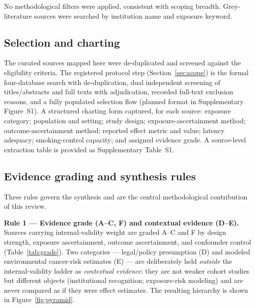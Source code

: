 \documentclass[3p,times]{elsarticle}
\begin{document}
No methodological filters were applied, consistent with scoping breadth. Grey-literature sources were searched by institution name and exposure keyword.

\subsection{Selection and charting}
The curated sources mapped here were de-duplicated and screened against the eligibility criteria. The registered protocol step (Section~\ref{sec:scope}) is the formal four-database search with de-duplication, dual independent screening of titles/abstracts and full texts with adjudication, recorded full-text exclusion reasons, and a fully populated selection flow (planned format in Supplementary Figure~S1). A structured charting form captured, for each source: exposure category; population and setting; study design; exposure-ascertainment method; outcome-ascertainment method; reported effect metric and value; latency adequacy; smoking-control capacity; and assigned evidence grade. A source-level extraction table is provided as Supplementary Table~S1.

\subsection{Evidence grading and synthesis rules}\label{sec:rules}
Three rules govern the synthesis and are the central methodological contribution of this review.

\textbf{Rule 1 --- Evidence grade (A--C, F) and contextual evidence (D--E).} Sources carrying internal-validity weight are graded A--C and F by design strength, exposure ascertainment, outcome ascertainment, and confounder control (Table~\ref{tab:grade}). Two categories --- legal/policy presumption (D) and modeled environmental cancer-risk estimates (E) --- are deliberately held \emph{outside} the internal-validity ladder as \emph{contextual evidence}: they are not weaker cohort studies but different objects (institutional recognition; exposure-risk modeling) and are never compared as if they were effect estimates. The resulting hierarchy is shown in Figure~\ref{fig:pyramid}.
\end{document}

